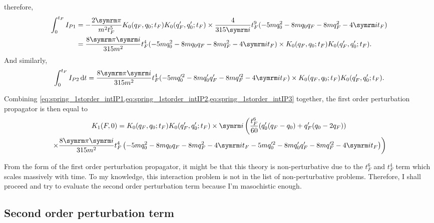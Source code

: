 therefore,
\begin{align}
    \int_{0}^{t_F} I_{P1} &= -\frac{2\cpi}{m^2t_F^5} K_0(q_F, q_0; t_F)K_0(q_F', q_0'; t_F) \times \frac{4}{315\im}t_F^9(-5mq_0^2 - 8mq_0q_F - 8mq_F^2 - 4\im t_F) \\
    &= \frac{8\cpi\im}{315m^2}t_F^4(-5mq_0^2 - 8mq_0q_F - 8mq_F^2 - 4\im t_F) \times K_0(q_F, q_0; t_F)K_0(q_F', q_0'; t_F).\label{eq:spring_1storder_intIP1}
\end{align}
And similarly,
\begin{equation}
    \int_{0}^{t_F}I_{P2}\dd{t} = \frac{8\cpi\im}{315m^2}t_F^4(-5mq_0'^2 - 8mq_0'q_F' - 8mq_F'^2 - 4\im t_F) \times K_0(q_F, q_0; t_F)K_0(q_F', q_0'; t_F).\label{eq:spring_1storder_intIP2}
\end{equation}

Combining \cref{eq:spring_1storder_intIP1,eq:spring_1storder_intIP2,eq:spring_1storder_intIP3} together, the first order perturbation propagator is then equal to
\begin{multline}
    K_1(F, 0) = K_0(q_F, q_0; t_F)K_0(q_F', q_0'; t_F) \times \im \left(\frac{t_F^6}{60}(q_0'(q_F - q_0) + q_F'(q_0 - 2q_F)) \right.\\ \left. \times \frac{8\cpi\im}{315m^2}t_F^4\left(-5mq_0^2 - 8mq_0q_F - 8mq_F^2 - 4\im t_F - 5mq_0'^2 - 8mq_0'q_F' - 8mq_F'^2 - 4\im t_F\right) \right)
\end{multline}

From the form of the first order perturbation propagator, it might be that this theory is non-perturbative due to the $t_F^6$ and $t_F^4$ term which scales massively with time. To my knowledge, this interaction problem is not in the list of non-perturbative problems. Therefore, I shall proceed and try to evaluate the second order perturbation term because I'm masochistic enough.

\subsection{Second order perturbation term}


